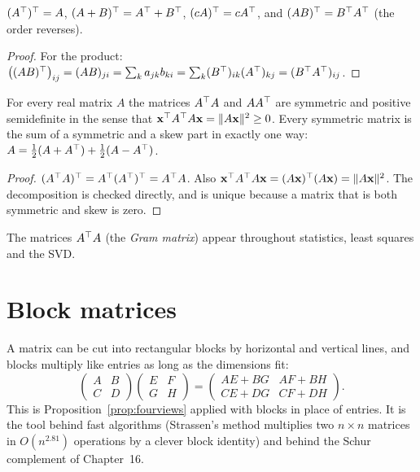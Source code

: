 \begin{proposition}\label{prop:transpose}
$(A^{\top})^{\top}=A$, $(A+B)^{\top}=A^{\top}+B^{\top}$, $(cA)^{\top}=cA^{\top}$, and $(AB)^{\top}=B^{\top} A^{\top}$ (the order reverses).
\end{proposition}

\begin{proof}
For the product: $\big((AB)^{\top}\big)_{ij}=(AB)_{ji}=\sum_k a_{jk}b_{ki}=\sum_k(B^{\top})_{ik}(A^{\top})_{kj}=(B^{\top} A^{\top})_{ij}$.
\end{proof}

\begin{proposition}\label{prop:gram}
For every real matrix $A$ the matrices $A^{\top} A$ and $AA^{\top}$ are symmetric and positive semidefinite in the sense that $\mathbf{x}^{\top} A^{\top} A\mathbf{x}=\lVert A\mathbf{x}\rVert^2\ge0$. Every symmetric matrix is the sum of a symmetric and a skew part in exactly one way: $A=\tfrac12(A+A^{\top})+\tfrac12(A-A^{\top})$.
\end{proposition}

\begin{proof}
$(A^{\top} A)^{\top}=A^{\top}(A^{\top})^{\top}=A^{\top} A$. Also $\mathbf{x}^{\top} A^{\top} A\mathbf{x}=(A\mathbf{x})^{\top}(A\mathbf{x})=\lVert A\mathbf{x}\rVert^2$. The decomposition is checked directly, and is unique because a matrix that is both symmetric and skew is zero.
\end{proof}

The matrices $A^{\top} A$ (the \emph{Gram matrix}) appear throughout statistics, least squares and the SVD.

\section{Block matrices}

A matrix can be cut into rectangular blocks by horizontal and vertical lines, and blocks multiply like entries as long as the dimensions fit:
\[
\begin{pmatrix}A&B\\C&D\end{pmatrix}\begin{pmatrix}E&F\\G&H\end{pmatrix}=\begin{pmatrix}AE+BG&AF+BH\\CE+DG&CF+DH\end{pmatrix}.
\]
This is Proposition~\ref{prop:fourviews} applied with blocks in place of entries. It is the tool behind fast algorithms (Strassen's method multiplies two $n\times n$ matrices in $O(n^{2.81})$ operations by a clever block identity) and behind the Schur complement of Chapter~16.

